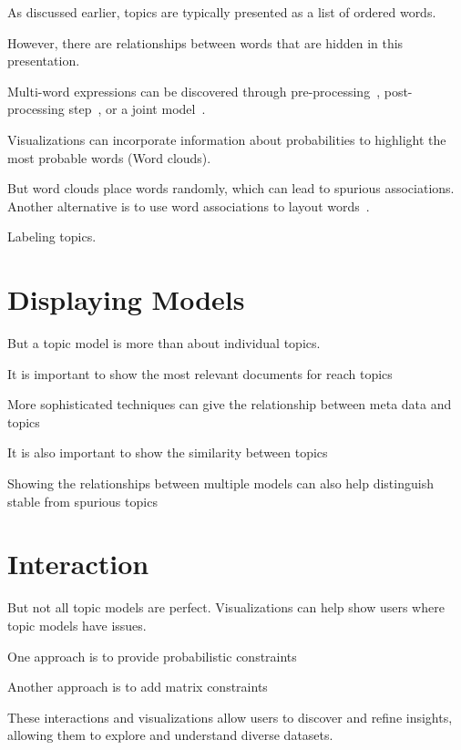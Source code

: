 As discussed earlier, topics are typically presented as a list of
ordered words.

However, there are relationships between words that are hidden in this
presentation.

Multi-word expressions can be discovered through
pre-processing~\citep{talley-11}, post-processing step~\citep{blei-09b},
or a joint model~\citep{johnson-10}.

Visualizations can incorporate information about probabilities to
highlight the most probable words (Word clouds).

But word clouds place words randomly, which can lead to spurious
associations.  Another alternative is to use word associations to
layout words~\citep{Smith:Chuang:Hu:Boyd-Graber:Findlater-2014}.

Labeling topics.

\section{Displaying Models}

But a topic model is more than about individual topics.

It is important to show the most relevant documents for reach
topics~\citep{chaney-12}

More sophisticated techniques can give the relationship between meta
data and topics~\citep{gardner-10,eistenstein-14}

It is also important to show the similarity between
topics~\citep{chuang-12}

Showing the relationships between multiple models can also help
distinguish stable from spurious topics~\citep{chuang-15}

\section{Interaction}

But not all topic models are perfect.  Visualizations can help show
users where topic models have issues.

One approach is to provide probabilistic constraints~\citep{hu-14:itm}

Another approach is to add matrix constraints~\citep{choo-13}

These interactions and visualizations allow users to discover and
refine insights, allowing them to explore and understand diverse
datasets.